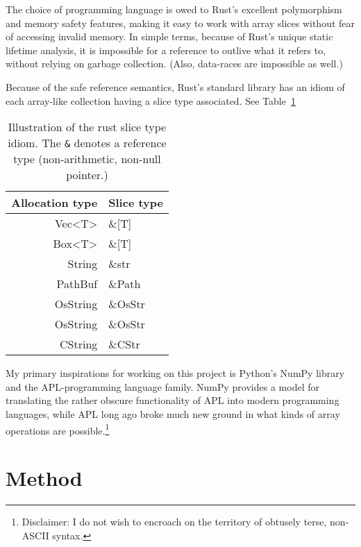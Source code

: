 \documentclass[a4paper,11pt,notitlepage]{article}
\begin{document}
The choice of programming language is owed to Rust's excellent polymorphism and memory safety
features, making it easy to work with array slices without fear of accessing invalid memory. In
simple terms, because of Rust's unique static lifetime analysis, it is impossible for a
reference to outlive what it refers to, without relying on garbage collection.
(Also, data-races are impossible as well.)

Because of the safe reference semantics, Rust's standard library has an idiom of each
array-like collection having a slice type associated. See Table~\ref{tab:slice-types}

\begin{table}
  \begin{center}
    \begin{minipage}{0.8\textwidth}
      \begin{center}
        \ttfamily
        \begin{tabular}{r | l}
          \rmfamily Allocation type & \rmfamily Slice type \\\hline
          Vec<T> & \&[T] \\
          Box<T> & \&[T] \\
          String & \&str \\
          PathBuf & \&Path \\
          OsString & \&OsStr \\
          OsString & \&OsStr \\
          CString & \&CStr \\
        \end{tabular}
      \end{center}
      \caption[Rust slice type idiom]{Illustration of the rust slice type idiom. The \texttt{\&} denotes
      a reference type (non-arithmetic, non-null pointer.)}
      \label{tab:slice-types}
    \end{minipage}
  \end{center}
\end{table}

My primary inspirations for working on this project is Python's NumPy library and
the APL-programming language family. NumPy provides a model for translating the rather
obscure functionality of APL into modern programming languages, while APL long ago broke
much new ground in what kinds of array operations are possible.\footnote{Disclaimer: I do not wish to encroach on the territory of obtusely terse, non-ASCII
syntax.}

\section{Method}
\end{document}

